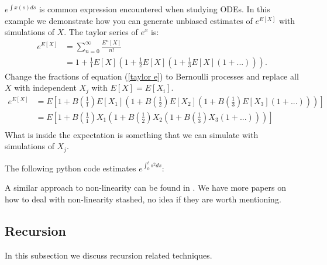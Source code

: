 \documentclass[a4paper,12pt]{article}
\begin{document}
\begin{example}[$e^{E[X]}$]
    $e^{\int x(s)ds}$ is common expression encountered when studying ODEs.
    In this example we demonstrate how you can generate unbiased estimates of
    $e^{E[X]}$ with simulations of $X$. The taylor series of $e^{x}$ is:
    \begin{align}
        e^{E[X]} & = \sum_{n=0}^{\infty} \frac{E^{n}[X]}{n!}     \\
                 & = 1 + \frac{1}{1}E[X]\left(1+ \frac{1}{2}E[X]
        \left(1+\frac{1}{3}E[X]\left(1+ ...\right)\right)\right). \label{taylor e}
    \end{align}
    Change the fractions of equation (\ref{taylor e}) to Bernoulli processes
    and replace all $X$ with independent $X_j$ with $E[X]=E[X_{i}]$.
    \begin{align}
        e^{E[X]} & = E
        \left[1 + B\left(\frac{1}{1}\right)E[X_1]
        \left(1+ B\left(\frac{1}{2}\right)E[X_2]
        \left(1+B\left(\frac{1}{3}\right)E[X_3]
        \left(1+ ...\right)
        \right)
        \right)
        \right]              \\
                 & = E\left[
            1 + B\left(\frac{1}{1}\right)X_1
            \left(1+ B\left(\frac{1}{2}\right)X_2
            \left(1+B\left(\frac{1}{3}\right)X_3
            \left(1+ ...\right)
            \right)
            \right)
        \right]              \\
    \end{align}
    What is inside the expectation is something that we can simulate with simulations of $X_{j}$.
\end{example}

\vspace{0.2cm}
\begin{pythonn}[$e^{E[X]}$]
    The following python code estimates $e^{\int_{0}^{t} s^{2}ds}$:
    \vspace*{0.4cm}
\end{pythonn}

\begin{related}
    A similar approach to non-linearity can be found in \cite{ermakov_monte_2019}.
    We have more papers on how to deal with non-linearity stashed, no idea if they are
    worth mentioning.
\end{related}

\subsection{Recursion}
In this subsection we discuss recursion related techniques.
\end{document}
